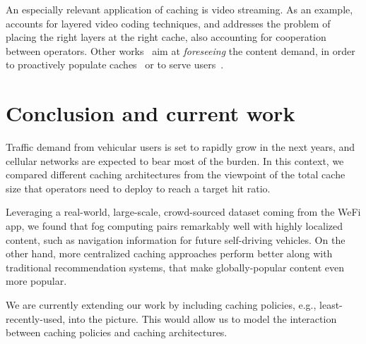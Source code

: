 \documentclass{sig-alternate-05-2015}
\begin{document}
An especially relevant application of caching is video streaming. As an example,~\cite{multiop-caching} accounts for layered video coding techniques, and addresses the problem of placing the right layers at the right cache, also accounting for cooperation between operators. Other works~\cite{proactive-caching,proseed} aim at {\em foreseeing} the content demand, in order to proactively populate caches~\cite{proactive-caching} or to serve users~\cite{proseed}.
\vspace{-2mm}

\section{Conclusion and current work}
\label{sec:conclusion}

Traffic demand from vehicular users is set to rapidly grow in the next
years, and cellular networks are expected to bear most of the
burden. In this context, we compared different caching
architectures from the viewpoint of the total cache size that operators need to deploy to reach a target hit ratio.

Leveraging a real-world, large-scale, crowd-sourced dataset coming
from the WeFi app, we found that fog computing pairs remarkably well
with highly localized content, such as navigation information for
future self-driving vehicles. On the other hand, more centralized
caching approaches perform better along with traditional
recommendation systems, that make globally-popular content even more popular.

We are currently extending our work by including caching policies, e.g., least-recently-used, into the picture. This would allow us to model the interaction between caching policies and caching architectures.
\vspace{-2mm}


\balancecolumns 
\end{document}
